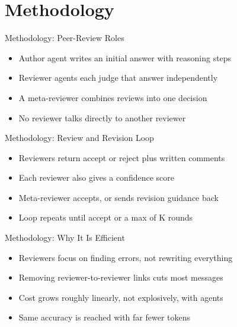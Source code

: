 \documentclass[10pt]{beamer}
\begin{document}
\section{Methodology}
\begin{frame}[allowframebreaks]{Methodology: Peer-Review Roles}
\begin{itemize}
  \item Author agent writes an initial answer with reasoning steps
  \item Reviewer agents each judge that answer independently
  \item A meta-reviewer combines reviews into one decision
  \item No reviewer talks directly to another reviewer
\end{itemize}
\end{frame}
\begin{frame}[allowframebreaks]{Methodology: Review and Revision Loop}
\begin{itemize}
  \item Reviewers return accept or reject plus written comments
  \item Each reviewer also gives a confidence score
  \item Meta-reviewer accepts, or sends revision guidance back
  \item Loop repeats until accept or a max of K rounds
\end{itemize}
\end{frame}
\begin{frame}[allowframebreaks]{Methodology: Why It Is Efficient}
\begin{itemize}
  \item Reviewers focus on finding errors, not rewriting everything
  \item Removing reviewer-to-reviewer links cuts most messages
  \item Cost grows roughly linearly, not explosively, with agents
  \item Same accuracy is reached with far fewer tokens
\end{itemize}
\end{frame}
\end{document}

